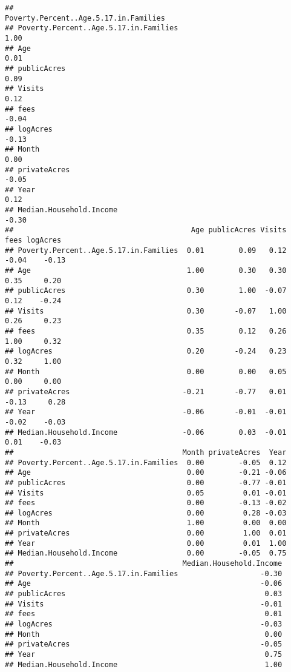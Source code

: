\documentclass[
]{article}
\begin{document}
\begin{verbatim}
##                                       Poverty.Percent..Age.5.17.in.Families
## Poverty.Percent..Age.5.17.in.Families                                  1.00
## Age                                                                    0.01
## publicAcres                                                            0.09
## Visits                                                                 0.12
## fees                                                                  -0.04
## logAcres                                                              -0.13
## Month                                                                  0.00
## privateAcres                                                          -0.05
## Year                                                                   0.12
## Median.Household.Income                                               -0.30
##                                         Age publicAcres Visits  fees logAcres
## Poverty.Percent..Age.5.17.in.Families  0.01        0.09   0.12 -0.04    -0.13
## Age                                    1.00        0.30   0.30  0.35     0.20
## publicAcres                            0.30        1.00  -0.07  0.12    -0.24
## Visits                                 0.30       -0.07   1.00  0.26     0.23
## fees                                   0.35        0.12   0.26  1.00     0.32
## logAcres                               0.20       -0.24   0.23  0.32     1.00
## Month                                  0.00        0.00   0.05  0.00     0.00
## privateAcres                          -0.21       -0.77   0.01 -0.13     0.28
## Year                                  -0.06       -0.01  -0.01 -0.02    -0.03
## Median.Household.Income               -0.06        0.03  -0.01  0.01    -0.03
##                                       Month privateAcres  Year
## Poverty.Percent..Age.5.17.in.Families  0.00        -0.05  0.12
## Age                                    0.00        -0.21 -0.06
## publicAcres                            0.00        -0.77 -0.01
## Visits                                 0.05         0.01 -0.01
## fees                                   0.00        -0.13 -0.02
## logAcres                               0.00         0.28 -0.03
## Month                                  1.00         0.00  0.00
## privateAcres                           0.00         1.00  0.01
## Year                                   0.00         0.01  1.00
## Median.Household.Income                0.00        -0.05  0.75
##                                       Median.Household.Income
## Poverty.Percent..Age.5.17.in.Families                   -0.30
## Age                                                     -0.06
## publicAcres                                              0.03
## Visits                                                  -0.01
## fees                                                     0.01
## logAcres                                                -0.03
## Month                                                    0.00
## privateAcres                                            -0.05
## Year                                                     0.75
## Median.Household.Income                                  1.00
\end{verbatim}
\end{document}
